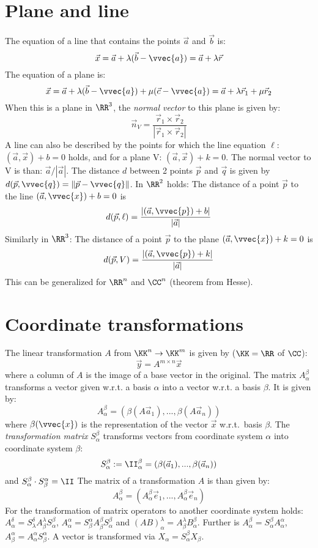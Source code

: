 \section{Plane and line}
The equation of a line that contains the points $\vec{a}$ and $\vec{b}$ is:
\[
\vec{x}=\vec{a}+\lambda(\vec{b}-\vvec{a})=\vec{a}+\lambda\vec{r}
\]
The equation of a plane is:
\[
\vec{x}=\vec{a}+\lambda(\vec{b}-\vvec{a})+\mu(\vec{c}-\vvec{a})=\vec{a}+\lambda\vec{r}_1+\mu\vec{r}_2
\]
When this is a plane in $\RR^3$, the {\it normal vector} to this plane is given
by:
\[
\vec{n}_V=\frac{\vec{r}_1\times\vec{r}_2}{|\vec{r}_1\times\vec{r}_2|}
\]
A line can also be described by the points for which the line equation
$\ell$: $(\vec{a},\vec{x})+b=0$ holds, and for a plane V: $(\vec{a},\vec{x})+k=0$.
The normal vector to V is than: $\vec{a}/|\vec{a}|$.
\npar
The distance $d$ between 2 points $\vec{p}$ and $\vec{q}$ is given by
$d(\vec{p},\vvec{q})=\|\vec{p}-\vvec{q}\|$.
\npar
In $\RR^2$ holds:
The distance of a point $\vec{p}$ to the line $(\vec{a},\vvec{x})+b=0$ is
\[
d(\vec{p},\ell)=\frac{|(\vec{a},\vvec{p})+b|}{|\vec{a}|}
\]
Similarly in $\RR^3$:
The distance of a point $\vec{p}$ to the plane $(\vec{a},\vvec{x})+k=0$ is
\[
d(\vec{p},V)=\frac{|(\vec{a},\vvec{p})+k|}{|\vec{a}|}
\]
This can be generalized for $\RR^n$ and $\CC^n$ (theorem from Hesse).

\section{Coordinate transformations}
The linear transformation $A$ from $\KK^n\rightarrow\KK^m$ is given by
($\KK=\RR$ of $\CC$):
\[
\vec{y}=A^{m\times n}\vec{x}
\]
where a column of $A$ is the image of a base vector in the original.
\npar
The matrix $A_\alpha^\beta$ transforms a vector given w.r.t. a basis
$\alpha$ into a vector w.r.t. a basis $\beta$. It is given by:
\[
A_\alpha^\beta=\left(\beta(A\vec{a}_1),...,\beta(A\vec{a}_n)\right)
\]
where $\beta(\vvec{x})$ is the representation of the vector $\vec{x}$
w.r.t.\ basis $\beta$.
\npar
The {\it transformation matrix} $S_\alpha^\beta$ transforms vectors from
coordinate system $\alpha$ into coordinate system $\beta$:
\[
S_\alpha^\beta:=\II_\alpha^\beta=\left(\beta(\vec{a}_1),...,\beta(\vec{a}_n)\right)
\]
and $S_\alpha^\beta\cdot S_\beta^\alpha=\II$
\npar
The matrix of a transformation $A$ is than given by:
\[
A_\alpha^\beta=\left(A_\alpha^\beta\vec{e}_1,...,A_\alpha^\beta\vec{e}_n\right)
\]
For the transformation of matrix operators to another coordinate system holds:
$A_\alpha^\delta=S_\lambda^\delta A_\beta^\lambda S_\alpha^\beta$,
$A_\alpha^\alpha=S_\beta^\alpha A_\beta^\beta S_\alpha^\beta$ and
$(AB)_\alpha^\lambda=A_\beta^\lambda B_\alpha^\beta$.
\npar
Further is $A_\alpha^\beta=S_\alpha^\beta A_\alpha^\alpha$,
$A_\beta^\alpha=A_\alpha^\alpha S_\beta^\alpha$. A vector is transformed via
$X_\alpha=S_\alpha^\beta X_\beta$.

